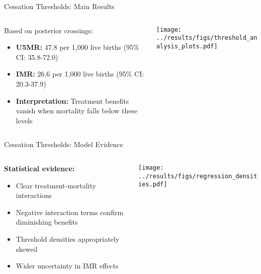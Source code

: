 \documentclass[aspectratio=169]{beamer}\usepackage[]{graphicx}\usepackage[dvipsnames]{xcolor}
\begin{document}
\begin{frame}{Cessation Thresholds: Main Results}
\begin{columns}
\begin{column}{0.35\textwidth}

Based on posterior crossings:
\begin{itemize}
\item \textbf{U5MR:} 47.8 per 1,000 live births (95\% CI: 35.8-72.0)
\item \textbf{IMR:} 26.6 per 1,000 live births (95\% CI: 20.3-37.9)
\item \textbf{Interpretation:} Treatment benefits vanish when mortality falls below these levels
\end{itemize}
\end{column}
\begin{column}{0.65\textwidth}
\begin{center}
\texttt{[image: ../results/figs/threshold\_analysis\_plots.pdf]}
\end{center}
\end{column}
\end{columns}
\end{frame}

\begin{frame}{Cessation Thresholds: Model Evidence}
\begin{columns}
\begin{column}{0.35\textwidth}
\textbf{Statistical evidence:}
\begin{itemize}
  \item Clear treatment-mortality interactions
  \item Negative interaction terms confirm diminishing benefits
  \item Threshold densities appropriately skewed
  \item Wider uncertainty in IMR effects
\end{itemize}
\end{column}
\begin{column}{0.6\textwidth}
\begin{center}
\texttt{[image: ../results/figs/regression\_densities.pdf]}
\end{center}
\end{column}
\end{columns}
\end{frame}
\end{document}
